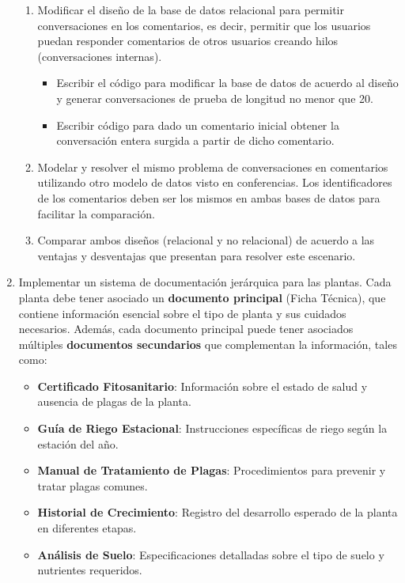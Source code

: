 \documentclass[10pt]{article}
\begin{document}
\begin{enumerate}
		\begin{enumerate}
			\item Modificar el diseño de la base de datos relacional para permitir conversaciones en los comentarios, es decir, permitir que los usuarios puedan responder comentarios de otros usuarios creando hilos (conversaciones internas).
			
			\begin{itemize}
				\item Escribir el código para modificar la base de datos de acuerdo al diseño y generar conversaciones de prueba de longitud no menor que 20.
				
				\item Escribir código para dado un comentario inicial obtener la conversación entera surgida a partir de dicho comentario.
			\end{itemize}
			
			\item Modelar y resolver el mismo problema de conversaciones en comentarios utilizando otro modelo de datos visto en conferencias. Los identificadores de los comentarios deben ser los mismos en ambas bases de datos para facilitar la comparación.
			
			\item Comparar ambos diseños (relacional y no relacional) de acuerdo a las ventajas y desventajas que presentan para resolver este escenario.
		\end{enumerate}
		
		\item Implementar un sistema de documentación jerárquica para las plantas. Cada planta debe tener asociado un \textbf{documento principal} (Ficha Técnica), que contiene información esencial sobre el tipo de planta y sus cuidados necesarios. Además, cada documento principal puede tener asociados múltiples \textbf{documentos secundarios} que complementan la información, tales como:
		
		\begin{itemize}
			\item \textbf{Certificado Fitosanitario}: Información sobre el estado de salud y ausencia de plagas de la planta.
			\item \textbf{Guía de Riego Estacional}: Instrucciones específicas de riego según la estación del año.
			\item \textbf{Manual de Tratamiento de Plagas}: Procedimientos para prevenir y tratar plagas comunes.
			\item \textbf{Historial de Crecimiento}: Registro del desarrollo esperado de la planta en diferentes etapas.
			\item \textbf{Análisis de Suelo}: Especificaciones detalladas sobre el tipo de suelo y nutrientes requeridos.
		\end{itemize}
		

\end{enumerate}
\end{document}
